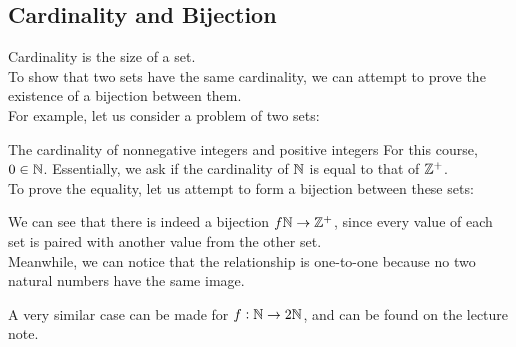 \subsection{Cardinality and Bijection}
Cardinality is the size of a set. \\
To show that two sets have the same cardinality, we can attempt to prove the existence of a bijection between them. \\
For example, let us consider a problem of two sets:
\begin{ln-quest}{The cardinality of nonnegative integers and positive integers}{}
    For this course, $0 \in \mathbb{N}$. Essentially, we ask if the cardinality of $\mathbb{N}$ is equal to that of $\mathbb{Z}^+$. \\
    To prove the equality, let us attempt to form a bijection between these sets:
    \begin{center}
    \end{center}
    We can see that there is indeed a bijection $f \mathbb{N} \rightarrow \mathbb{Z}^+$, since every value of each set is paired with another value from the other set. \\
    Meanwhile, we can notice that the relationship is one-to-one because no two natural numbers have the same image.
\end{ln-quest}
A very similar case can be made for $f: \mathbb{N} \rightarrow 2\mathbb{N}$, and can be found on the lecture note.

